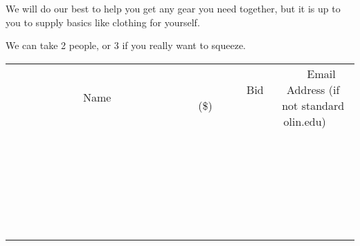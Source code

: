\documentclass[11pt]{article}
\begin{document}
We will do our best to help you get any gear you need together, but it is up to you to supply basics like clothing for yourself.

We can take 2 people, or 3 if you really want to squeeze. \\[6ex]
\begin{tabular}{c c c}
~~~~~~~~~~~~~Name~~~~~~~~~~~~~ & ~~~~~~~~~Bid (\$)~~~~~~~~~ & ~~~Email Address (if not standard olin.edu)~~~ \\
 & & \\
\hline
 & & \\
\hline
 & & \\
\hline
 & & \\
\hline
 & & \\
\hline
 & & \\
\hline
 & & \\
\hline
 & & \\
\hline
 & & \\
\hline
 & & \\
\hline
 & & \\
\hline
 & & \\
\hline
 & & \\
\hline
 & & \\
\hline
 & & \\
\hline
 & & \\
\hline
 & & \\
\hline
 & & \\
\hline
 & & \\
\hline
 & & \\
\hline
 & & \\
\hline
 & & \\
\hline
 & & \\
\hline
 & & \\
\hline
 & & \\
\hline
 & & \\
\hline
\end{tabular}
\clearpage
\end{document}
